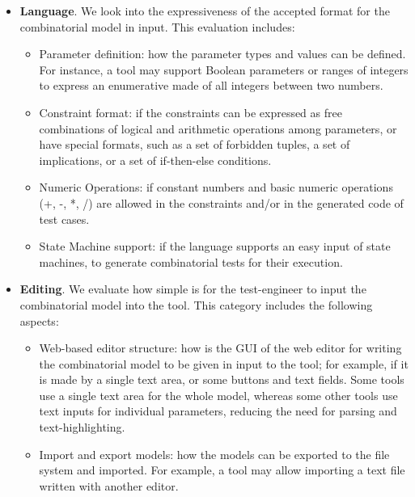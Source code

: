 \begin{tikzborder}{\cite{Gargantini16:validation}}
\begin{tikzborder}{\cite{gargantini_combinatorial_2017}}
\begin{tikzborder}{\cite{gargantini_combinatorial_2017}}
\begin{tikzborder}{\cite{garn2019}}
\begin{tikzborder}{\cite{arcaini2019achieving}}
\begin{tikzborder}{}
\begin{itemize}
	\item \textbf{Language}. We look into the expressiveness of the accepted format for the combinatorial model in input. This evaluation includes:
	\begin{itemize}
		\item Parameter definition: how the parameter types and values  can be defined. For instance, a tool may support Boolean parameters or ranges of integers to express an enumerative made of all integers between two numbers.
		\item Constraint format: if the constraints can be expressed as free combinations of logical and arithmetic operations among parameters, or have special formats, such as a set of forbidden tuples, a set of implications, or a set of if-then-else conditions. 
		\item Numeric Operations: if constant numbers and basic numeric operations (+, -, *, /) are allowed in the constraints and/or in the generated code of test cases.
		\item State Machine support: if the language supports an easy input of state machines, to generate combinatorial tests for their execution.
	\end{itemize} 
	\item \textbf{Editing}. We evaluate how simple is for the test-engineer to input the combinatorial model into the tool. This category includes the following aspects:
	\begin{itemize}
		\item Web-based editor structure: how is the GUI of the web editor for writing the combinatorial model to be given in input to the tool; for example, if it is made by a single text area, or some buttons and text fields. Some tools use a single text area for the whole model, whereas some other tools use text inputs for individual parameters, reducing the need for parsing and text-highlighting.
		
		\item Import and export models: how the models can be exported to the file system and imported. For example, a tool may allow importing a text file written with another editor.
		

\end{itemize}
\end{itemize}
\end{tikzborder}
\end{tikzborder}
\end{tikzborder}
\end{tikzborder}
\end{tikzborder}
\end{tikzborder}
